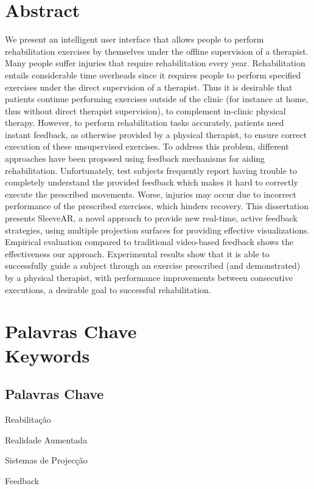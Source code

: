 \chapter*{Abstract}
\thispagestyle{empty}

We present an intelligent user interface that allows people to perform rehabilitation exercises by themselves under the offline supervision of a therapist.  Many people suffer injuries that require rehabilitation every year. Rehabilitation entails considerable time overheads since it requires people to perform specified exercises under the direct supervision of a therapist. Thus it is desirable that patients continue performing exercises outside of the clinic (for instance at home, thus without direct therapist supervision), to complement in-clinic physical therapy.
However, to perform rehabilitation tasks accurately, patients need instant feedback, as otherwise provided by a physical therapist, to ensure correct execution of these unsupervised exercises. 
To address this problem, different approaches have been proposed using feedback mechanisms for aiding rehabilitation. 
Unfortunately, test subjects frequently report having trouble to completely understand the provided feedback which makes it hard to correctly execute the prescribed movements. 
Worse, injuries may occur due to incorrect performance of the prescribed exercises, which hinders recovery. This dissertation presents SleeveAR, a novel approach to provide new real-time, active feedback strategies, using multiple projection surfaces for providing effective visualizations.
Empirical evaluation compared to traditional video-based feedback shows the effectiveness our approach. Experimental results show that it is able to successfully guide a subject through an exercise prescribed (and demonstrated) by a physical therapist, with performance improvements between consecutive executions, a desirable goal to successful rehabilitation.


\newpage


\chapter*{Palavras Chave \\ Keywords}
\thispagestyle{empty}

\section*{Palavras Chave}
{\large %

\noindent Reabilita\c{c}\~ao

\noindent Realidade Aumentada

\noindent Sistemas de Projec\c{c}\~{a}o

\noindent Feedback


}

